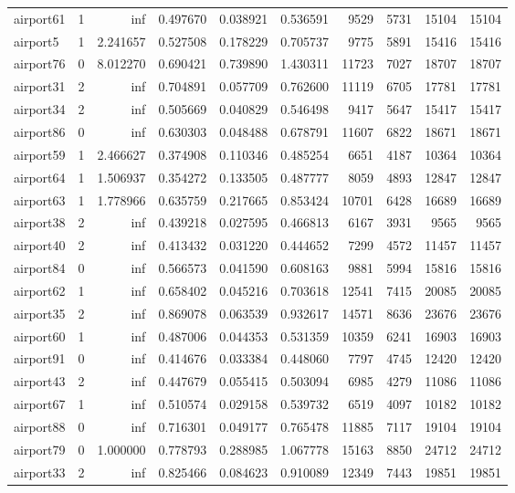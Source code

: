 \begin{longtable}{|l|r|r|r|r|r|r|r|r|r|}
airport61 & 1 & inf & 0.497670 & 0.038921 & 0.536591 & 9529 & 5731 & 15104 & 15104 \\
airport5 & 1 & 2.241657 & 0.527508 & 0.178229 & 0.705737 & 9775 & 5891 & 15416 & 15416 \\
airport76 & 0 & 8.012270 & 0.690421 & 0.739890 & 1.430311 & 11723 & 7027 & 18707 & 18707 \\
airport31 & 2 & inf & 0.704891 & 0.057709 & 0.762600 & 11119 & 6705 & 17781 & 17781 \\
airport34 & 2 & inf & 0.505669 & 0.040829 & 0.546498 & 9417 & 5647 & 15417 & 15417 \\
airport86 & 0 & inf & 0.630303 & 0.048488 & 0.678791 & 11607 & 6822 & 18671 & 18671 \\
airport59 & 1 & 2.466627 & 0.374908 & 0.110346 & 0.485254 & 6651 & 4187 & 10364 & 10364 \\
airport64 & 1 & 1.506937 & 0.354272 & 0.133505 & 0.487777 & 8059 & 4893 & 12847 & 12847 \\
airport63 & 1 & 1.778966 & 0.635759 & 0.217665 & 0.853424 & 10701 & 6428 & 16689 & 16689 \\
airport38 & 2 & inf & 0.439218 & 0.027595 & 0.466813 & 6167 & 3931 & 9565 & 9565 \\
airport40 & 2 & inf & 0.413432 & 0.031220 & 0.444652 & 7299 & 4572 & 11457 & 11457 \\
airport84 & 0 & inf & 0.566573 & 0.041590 & 0.608163 & 9881 & 5994 & 15816 & 15816 \\
airport62 & 1 & inf & 0.658402 & 0.045216 & 0.703618 & 12541 & 7415 & 20085 & 20085 \\
airport35 & 2 & inf & 0.869078 & 0.063539 & 0.932617 & 14571 & 8636 & 23676 & 23676 \\
airport60 & 1 & inf & 0.487006 & 0.044353 & 0.531359 & 10359 & 6241 & 16903 & 16903 \\
airport91 & 0 & inf & 0.414676 & 0.033384 & 0.448060 & 7797 & 4745 & 12420 & 12420 \\
airport43 & 2 & inf & 0.447679 & 0.055415 & 0.503094 & 6985 & 4279 & 11086 & 11086 \\
airport67 & 1 & inf & 0.510574 & 0.029158 & 0.539732 & 6519 & 4097 & 10182 & 10182 \\
airport88 & 0 & inf & 0.716301 & 0.049177 & 0.765478 & 11885 & 7117 & 19104 & 19104 \\
airport79 & 0 & 1.000000 & 0.778793 & 0.288985 & 1.067778 & 15163 & 8850 & 24712 & 24712 \\
airport33 & 2 & inf & 0.825466 & 0.084623 & 0.910089 & 12349 & 7443 & 19851 & 19851 \\

\end{longtable}
